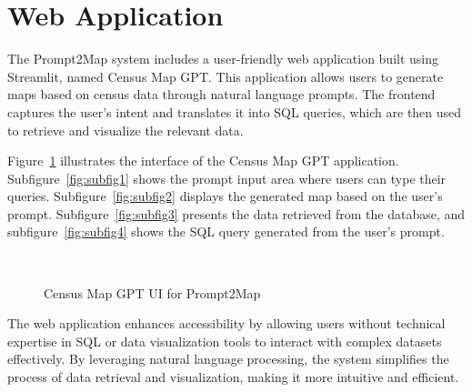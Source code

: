 \section{Web Application}

The Prompt2Map system includes a user-friendly web application built using Streamlit, named Census Map GPT. This application allows users to generate maps based on census data through natural language prompts. The frontend captures the user's intent and translates it into SQL queries, which are then used to retrieve and visualize the relevant data.

Figure~\ref{fig:prompt2map_ui} illustrates the interface of the Census Map GPT application. Subfigure~\ref{fig:subfig1} shows the prompt input area where users can type their queries. Subfigure~\ref{fig:subfig2} displays the generated map based on the user's prompt. Subfigure~\ref{fig:subfig3} presents the data retrieved from the database, and subfigure~\ref{fig:subfig4} shows the SQL query generated from the user's prompt.

\begin{figure}[htbp]
  \centering
  \\
  \caption{Census Map GPT UI for Prompt2Map}
  \label{fig:prompt2map_ui}
\end{figure}

The web application enhances accessibility by allowing users without technical expertise in SQL or data visualization tools to interact with complex datasets effectively. By leveraging natural language processing, the system simplifies the process of data retrieval and visualization, making it more intuitive and efficient.